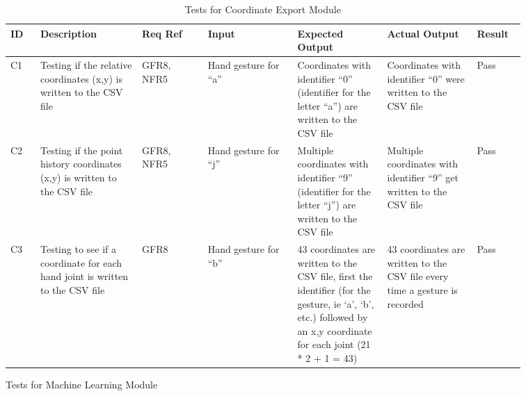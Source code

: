 \documentclass[12pt, titlepage]{article}
\begin{document}
\renewcommand{\arraystretch}{1.2}
\noindent \begin{longtable}{p{0.05\linewidth}|p{0.17\linewidth}|p{0.11\linewidth}|p{0.15\linewidth}|p{0.15\linewidth}|p{0.15\linewidth}|p{0.08\linewidth}}
\hline
\textbf{ID} & \textbf{Description} & \textbf{Req Ref} & \textbf{Input} & \textbf{Expected Output} & \textbf{Actual Output} & \textbf{Result}\\
\hline
C1 & Testing if the relative coordinates (x,y) is written to the CSV file & GFR8, NFR5 & Hand gesture for “a” & Coordinates with identifier “0” (identifier for the letter “a”) are written to the CSV file & Coordinates with identifier “0” were written to the CSV file & Pass\\ \hline
C2 & Testing if the point history coordinates (x,y) is written to the CSV file & GFR8, NFR5 & Hand gesture for “j” & Multiple coordinates with identifier “9” (identifier for the letter “j”) are written to the CSV file & Multiple coordinates with identifier “9” get written to the CSV file & Pass\\ \hline
C3 & Testing to see if a coordinate for each hand joint is written to the CSV file & GFR8 & Hand gesture for “b” & 43 coordinates are written to the CSV file, first the identifier (for the gesture, ie ‘a’, ‘b’, etc.) followed by an x,y coordinate for each joint (21 * 2 + 1 = 43) & 43 coordinates are written to the CSV file every time a gesture is recorded & Pass
\hline
\caption{Tests for Coordinate Export Module}
\end{longtable}

\newpage
\centerline{Tests for Machine Learning Module}
\end{document}
